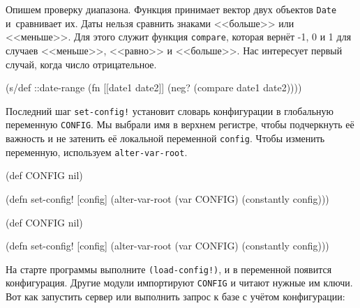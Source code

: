 \fi


Опишем проверку диапазона. Функция принимает вектор двух объектов \verb|Date|
и~сравнивает их. Даты нельзя сравнить знаками <<больше>> или <<меньше>>. Для
этого служит функция \verb|compare|, которая вернёт -1, 0 и 1 для случаев
<<меньше>>, <<равно>> и <<больше>>. Нас интересует первый случай, когда число
отрицательное.

\begin{english}
  \begin{clojure}
(s/def ::date-range
  (fn [[date1 date2]]
    (neg? (compare date1 date2))))
  \end{clojure}
\end{english}

Последний шаг \verb|set-config!| установит словарь конфигурации в глобальную
переменную \verb|CONFIG|. Мы выбрали имя в верхнем регистре, чтобы подчеркнуть
её важность и не затенить её локальной переменной \verb|config|. Чтобы изменить
переменную, используем \verb|alter-var-root|.


\ifx\DEVICETYPE\MOBILE

\begin{english}
  \begin{clojure}
(def CONFIG nil)

(defn set-config!
  [config]
  (alter-var-root (var CONFIG)
    (constantly config)))
  \end{clojure}
\end{english}

\else

\begin{english}
  \begin{clojure}
(def CONFIG nil)

(defn set-config!
  [config]
  (alter-var-root (var CONFIG) (constantly config)))
  \end{clojure}
\end{english}

\fi

На старте программы выполните \texttt{(load-con\-fig!)}, и в переменной появится
конфигурация. Другие модули импортируют \verb|CONFIG| и читают нужные им
ключи. Вот как запустить сервер или выполнить запрос к базе с учётом
конфигурации:


\ifx\DEVICETYPE\MOBILE

